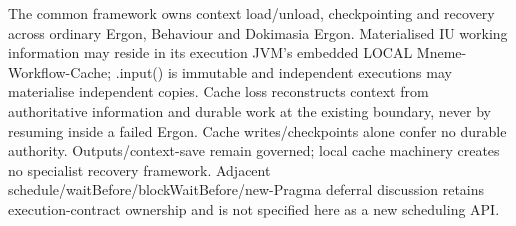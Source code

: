 The common framework owns context load/unload, checkpointing and recovery across ordinary Ergon, Behaviour and Dokimasia Ergon. Materialised IU working information may reside in its execution JVM's embedded LOCAL Mneme-Workflow-Cache; .input() is immutable and independent executions may materialise independent copies. Cache loss reconstructs context from authoritative information and durable work at the existing boundary, never by resuming inside a failed Ergon. Cache writes/checkpoints alone confer no durable authority. Outputs/context-save remain governed; local cache machinery creates no specialist recovery framework. Adjacent schedule/waitBefore/blockWaitBefore/new-Pragma deferral discussion retains execution-contract ownership and is not specified here as a new scheduling API.



